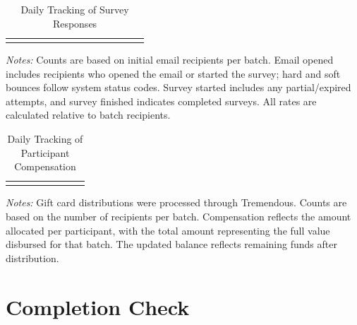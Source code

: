 \documentclass[11pt]{article}
\theoremstyle{definition}
\begin{document}
\begin{table}[H]
    \centering
    \caption{Daily Tracking of Survey Responses}
    \begin{adjustbox}{width=1\linewidth} 
    \begin{tabular}{lccccccccccccc}
    \hline \vspace{-.4cm} \\
    
    \end{tabular}
    \end{adjustbox}
    \label{tab:montly_kits}
          {\parbox{1\linewidth}{           %
		\scriptsize{{{ \textit{Notes:} Counts are based on initial email recipients per batch. Email opened includes recipients who opened the email or started the survey; hard and soft bounces follow system status codes. Survey started includes any partial/expired attempts, and survey finished indicates completed surveys. All rates are calculated relative to batch recipients.}}}}}
\end{table}

\begin{table}[H]
    \centering
    \caption{Daily Tracking of Participant Compensation}
    \begin{adjustbox}{width=0.75\linewidth} 
    \begin{tabular}{lccccccc} 
    \hline \vspace{-.4cm} \\
    
    \end{tabular}
    \end{adjustbox}
    \label{tab:email_delivery}
          {\parbox{1\linewidth}{           %
		\scriptsize{{{ \textit{Notes:} Gift card distributions were processed through Tremendous. Counts are based on the number of recipients per batch. Compensation reflects the amount allocated per participant, with the total amount representing the full value disbursed for that batch. The updated balance reflects remaining funds after distribution.}}}}}
\end{table}

\section{Completion Check}

%
\end{document}
